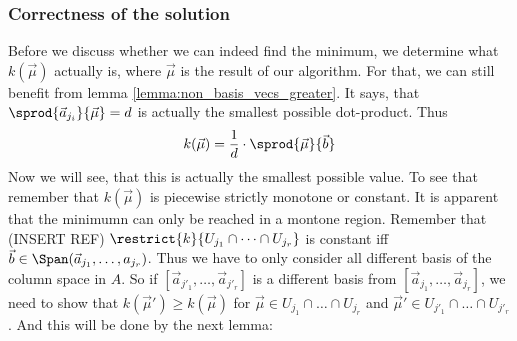 \subsubsection{Correctness of the solution}
Before we discuss whether we can indeed find the minimum, we determine what $k(\vec\mu)$ actually is, where $\vec\mu$ is the result of our algorithm. For that, we can still benefit from lemma \ref{lemma:non_basis_vecs_greater}. It says, that $\sprod{\vec a_{j_i}}{\vec\mu} = d$ is actually the smallest possible dot-product. Thus
$$k(\vec\mu) = \frac{1}{d}\cdot\sprod{\vec\mu}{\vec b}$$
Now we will see, that this is actually the smallest possible value. To see that remember that $k(\vec\mu)$ is piecewise strictly monotone or constant. It is apparent that the minimumn can only be reached in a montone region. Remember that (INSERT REF) $\restrict{k}{U_{j_1} \cap \dots \cap U_{j_r}}$ is constant iff $\vec b \in \Span(\vec a_{j_1}, \dots, a_{j_r})$. Thus we have to only consider all different basis of the column space in $A$. So if $[\vec a_{j'_1}, \dots, \vec a_{j'_r}]$ is a different basis from $[\vec a_{j_1}, \dots, \vec a_{j_r}]$, we need to show that $k(\vec\mu') \geq k(\vec\mu)$ for $\vec\mu \in U_{j_1} \cap \dots \cap U_{j_r}$ and $\vec\mu' \in U_{j'_1} \cap \dots \cap U_{j'_r}$. And this will be done by the next lemma:


